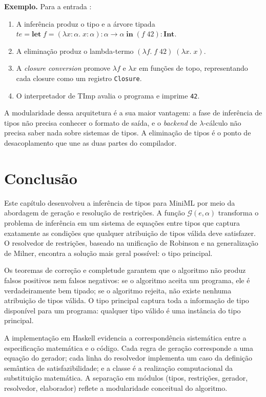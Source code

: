   \textbf{Exemplo.} Para a entrada :

  \begin{enumerate}
    \item A inferência produz o tipo  e a árvore tipada
      \(te = \mathbf{let}\; f = (\lambda x{:}\alpha.\; x{:}\alpha){:}\alpha
      \to \alpha\; \mathbf{in}\; (f\; 42){:}\mathbf{Int}\).
    \item A eliminação produz o lambda-termo
      \((\lambda f.\; f\; 42)\; (\lambda x.\; x)\).
    \item A \emph{closure conversion} promove \(\lambda f\) e \(\lambda
      x\) em funções de topo, representando cada closure como um registro
      \texttt{Closure}.
    \item O interpretador de TImp avalia o programa e imprime \texttt{42}.
  \end{enumerate}

  A modularidade dessa arquitetura é a sua maior vantagem: a fase de
  inferência de tipos não precisa conhecer o formato de saída, e o
  \emph{backend} de $\lambda$-cálculo não precisa saber nada sobre sistemas
  de tipos. A eliminação de tipos é o ponto de desacoplamento que une as
  duas partes do compilador.

  \section{Conclusão}

  Este capítulo desenvolveu a inferência de tipos para MiniML por meio
  da abordagem de geração e resolução de restrições. A função
  \(\mathcal{G}(e, \alpha)\) transforma o
  problema de inferência em um sistema de equações entre tipos que
  captura exatamente as condições que qualquer atribuição de tipos
  válida deve satisfazer. O resolvedor de restrições, baseado na
  unificação de Robinson e na generalização de Milner, encontra a
  solução mais geral possível: o tipo principal.

  Os teoremas de correção e completude garantem que o algoritmo não
  produz falsos positivos nem falsos negativos: se o algoritmo aceita
  um programa, ele é verdadeiramente bem tipado; se o algoritmo
  rejeita, não existe nenhuma atribuição de tipos válida. O tipo
  principal captura toda a informação de tipo disponível para um
  programa: qualquer tipo válido é uma instância do tipo principal.

  A implementação em Haskell evidencia a correspondência sistemática
  entre a especificação matemática e o código. Cada regra de geração
  corresponde a uma equação do gerador; cada linha do resolvedor
  implementa um caso da definição semântica de satisfazibilidade; e a
  classe  é a realização computacional
  da substituição matemática. A separação em módulos (tipos,
  restrições, gerador, resolvedor, elaborador) reflete a
  modularidade conceitual do algoritmo.

